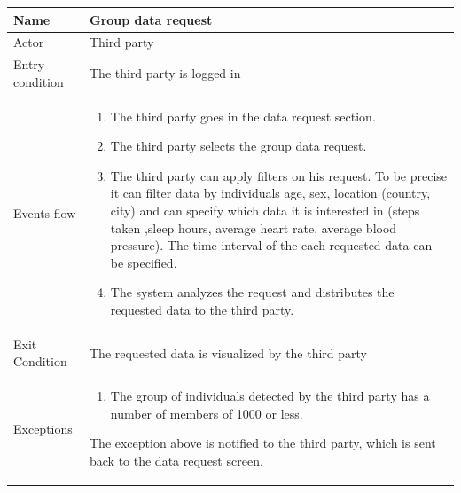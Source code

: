 \begin{table}[p]
\centering
\begin{tabular}{|l|p{11cm}|}
    \hline
    Name & Group data request
    \\ \hline
    Actor & Third party
    \\ \hline 
    Entry condition & The third party is logged in
        \\ \hline
    Events flow &
    \begin{enumerate}
    \item The third party goes in the data request section.
    \item The third party selects the group data request.
	\item The third party can apply filters on his request. To be precise it can filter data by individuals age, sex, location (country, city) and can specify which data it is interested in (steps taken ,sleep hours, average heart rate, average blood pressure). The time interval of the each requested data can be specified.
	\item The system analyzes the request and distributes the requested data to the third party.
    \end{enumerate}
     \\ \hline
     Exit Condition & The requested data is visualized by the third party
     \\
    \hline
    Exceptions &
        \begin{enumerate}
    \item The group of individuals detected by the third party has a number of members of 1000 or less.
    \end{enumerate}
      The exception above is notified to the third party, which is sent back to the data request screen.
	 \\
    \hline
\end{tabular}
\end{table}

